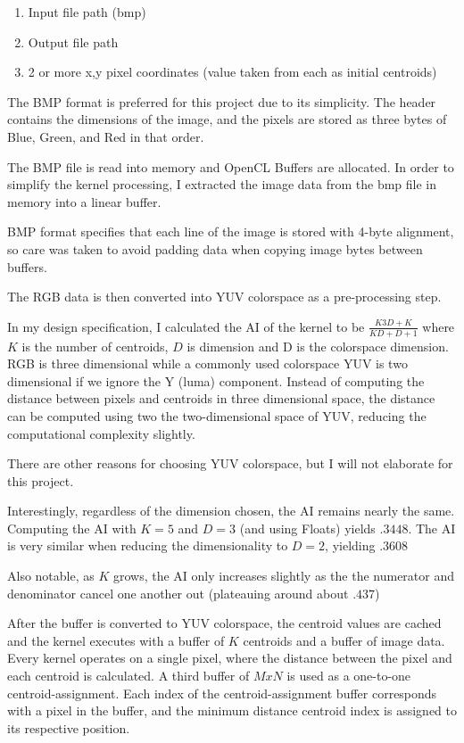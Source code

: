\documentclass[11pt]{article}
\begin{document}
\begin{enumerate}
\item Input file path (bmp)
\item Output file path
\item 2 or more x,y pixel coordinates (value taken from each as initial centroids)
\end{enumerate}

The BMP format is preferred for this project due to its simplicity. The header
contains the dimensions of the image, and the pixels are stored as three bytes
of Blue, Green, and Red in that order. \cite{bmp_wiki}

The BMP file is read into memory and OpenCL Buffers are allocated. In order to
simplify the kernel processing, I extracted the image data from the bmp file in
memory into a linear buffer. 

BMP format specifies that each line of the image is stored with 4-byte alignment,
so care was taken to avoid padding data when copying image bytes between buffers.

The RGB data is then converted into YUV colorspace as a pre-processing step.

In my design specification, I calculated the AI of the kernel to be 
$\frac{K3D+K}{KD+D+1}$ where $K$ is the number of centroids, $D$ is dimension and 
D is the colorspace dimension. RGB is three dimensional while a commonly used
colorspace YUV is two dimensional if we ignore the Y (luma) component. Instead of 
computing the distance between pixels and centroids in three dimensional space, 
the distance can be computed using two the two-dimensional space of YUV, reducing 
the computational complexity slightly. 

There are other reasons for choosing YUV colorspace, but I will not elaborate for
this project.

Interestingly, regardless of the dimension chosen, the AI remains nearly the same. 
Computing the AI with $K = 5$ and $D = 3$ (and using Floats) yields $.3448$. The AI
is very similar when reducing the dimensionality to $D = 2$, yielding $.3608$

Also notable, as $K$ grows, the AI only increases slightly as the the numerator and 
denominator cancel one another out (plateauing around about $.437$)

After the buffer is converted to YUV colorspace, the centroid values are cached
and the kernel executes with a buffer of $K$ centroids and a buffer of image data.
Every kernel operates on a single pixel, where the distance between the pixel
and each centroid is calculated. A third buffer of $MxN$ is used as a one-to-one 
centroid-assignment. Each index of the centroid-assignment buffer corresponds with
a pixel in the buffer, and the minimum distance centroid index is assigned to its
respective position.
\end{document}
